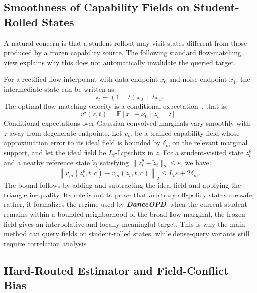 \documentclass{llmxive}
\providecommand{\name}{\textsl{\textbf{DanceOPD}}\xspace}
\begin{document}
\vspace{0.2cm}


\subsection{Smoothness of Capability Fields on Student-Rolled States}
\label{app:smoothness}

A natural concern is that a student rollout may visit states different from those produced by a frozen capability source. The following standard flow-matching view explains why this does not automatically invalidate the queried target.

For a rectified-flow interpolant with data endpoint $x_0$ and noise endpoint $x_1$, the intermediate state can be written as:
\begin{equation}
  z_t=(1-t)x_0+t x_1.
\end{equation}
The optimal flow-matching velocity is a conditional expectation~\cite{lipman2022flow}, that is:
\begin{equation}
  v^\star(z,t)=\mathbb{E}\!\left[x_1-x_0 \mid z_t=z\right].
  \label{eq:app-fm-condexp}
\end{equation}
Conditional expectations over Gaussian-convolved marginals vary smoothly with $z$ away from degenerate endpoints. Let $v_m$ be a trained capability field whose approximation error to its ideal field is bounded by $\delta_m$ on the relevant marginal support, and let the ideal field be $L_t$-Lipschitz in $z$. For a student-visited state $z_t^\theta$ and a nearby reference state $\tilde z_t$ satisfying $\|z_t^\theta-\tilde z_t\|_2\le\varepsilon$, we have:
\begin{equation}
  \left\|v_m(z_t^\theta,t,c)-v_m(\tilde z_t,t,c)\right\|_2
  \le L_t\varepsilon+2\delta_m.
  \label{eq:app-teacher-robust}
\end{equation}
The bound follows by adding and subtracting the ideal field and applying the triangle inequality. Its role is not to prove that arbitrary off-policy states are safe; rather, it formalizes the regime used by \name{}: when the current student remains within a bounded neighborhood of the broad flow marginal, the frozen field gives an interpolative and locally meaningful target. This is why the main method can query fields on student-rolled states, while dense-query variants still require correlation analysis.


\vspace{0.2cm}


\subsection{Hard-Routed Estimator and Field-Conflict Bias}
\label{app:hard-routing-math}
\end{document}
